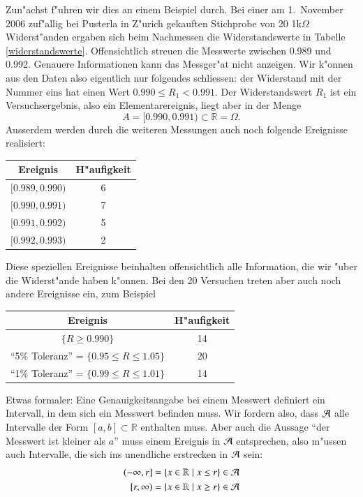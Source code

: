 Zun"achst f"uhren wir dies an einem Beispiel durch.
Bei einer am 1.~November 2006
zuf"allig bei Pusterla in Z"urich gekauften Stichprobe von 20 1k$\Omega$
Widerst"anden ergaben sich beim Nachmessen die Widerstandswerte in 
Tabelle \ref{widerstandswerte}.
Offensichtlich streuen die Messwerte
zwischen 0.989 und 0.992.
Genauere Informationen kann das Messger"at nicht
anzeigen.
Wir k"onnen aus den Daten also eigentlich nur folgendes schliessen:
der Widerstand mit der Nummer eins hat einen Wert $0.990\le R_1<0.991$.
Der Widerstandswert $R_1$ ist ein Versuchsergebnis, also ein Elementarereignis,
liegt aber in der Menge
\[
A=[0.990,0.991)\subset \mathbb{R}=\Omega.
\]
Ausserdem werden durch die weiteren Messungen auch noch folgende
Ereignisse realisiert:
\begin{center}
\begin{tabular}{|c|c|}
\hline
Ereignis&H"aufigkeit\\
\hline
$[0.989,0.990)$&6\\
$[0.990,0.991)$&7\\
$[0.991,0.992)$&5\\
$[0.992,0.993)$&2\\
\hline
\end{tabular}
\end{center}
Diese speziellen Ereignisse beinhalten offensichtlich alle Information,
die wir "uber die Widerst"ande haben k"onnen.
Bei den 20 Versuchen treten aber auch noch andere Ereignisse ein,
zum Beispiel
\begin{center}
\begin{tabular}{|c|c|}
\hline
Ereignis&H"aufigkeit\\
\hline
$\{R\ge 0.990\}$&14\\
``5\% Toleranz'' = $\{0.95\le R\le1.05\}$&20\\
``1\% Toleranz'' = $\{0.99\le R\le 1.01\}$&14\\
\hline
\end{tabular}
\end{center}

Etwas formaler: Eine Genauigkeitsangabe bei einem Messwert definiert
ein Intervall, in dem sich ein Messwert befinden muss.
Wir
fordern also, dass $\cal A$ alle Intervalle der Form $[a,b]\subset\mathbb R$
enthalten muss.
Aber auch die Aussage ``der Messwert ist kleiner als $a$''
muss einem Ereignis in $\cal A$ entsprechen, also m"ussen auch Intervalle,
die sich ins unendliche erstrecken in $\cal A$ sein:
\begin{align*}{}
(-\infty,r]&=\{x\in\mathbb R\;|\;x \le r\} \in \cal A\\
\;[r,\infty)&=\{x\in\mathbb R\;|\;x \ge r\} \in \cal A
\end{align*}

